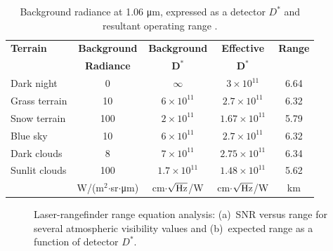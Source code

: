 \begin{table}[tb]
\centering
\caption{Background radiance at 1.06 \si{\micro\metre}{}, expressed as a detector $D^\ast$ and resultant operating range \cite{Kaminski1980}.\label{tab:rangefinderperformance}}
\begin{tabular}{|l|c|c|c|c|}
\hline
\textbf{Terrain} & \textbf{Background} & \textbf{Background} & \textbf{Effective} & \textbf{Range} \\
         & \textbf{Radiance} &$\bm{D^\ast}$&$\bm{D^\ast}$ & \\
\hline
Dark night   & 0    & $\infty$               & $3\times10^{11}$ &6.64 \\
Grass terrain & 10 & $6\times10^{11}$ &$2.7\times10^{11}$ & 6.32\\
Snow terrain & 100 &$2\times10^{11}$ &$1.67\times10^{11}$ &5.79 \\
\hline
Blue sky & 10 &$6\times10^{11}$ &$2.7\times10^{11}$ & 6.32\\
Dark clouds & 8 &$7\times10^{11}$ &$2.75\times10^{11}$  &6.34 \\
Sunlit clouds & 100 & $1.7\times10^{11}$ &$1.48\times10^{11}$ &5.62 \\
\hline
& W/(m$^2$$\cdot$sr$\cdot$\si{\micro\metre}{}) & cm$\cdot$$\sqrt{\rm Hz}$/W & cm$\cdot$$\sqrt{\rm Hz}$/W  & km\colheightrule\\
\hline
\end{tabular}
\end{table}

\begin{figure}[tb]
\centering
{}
\caption
{\label{kamif}Laser-rangefinder range equation analysis: (a)~SNR versus range for several atmospheric visibility values and (b)~expected range as a function of detector $D^\ast$.}
\end{figure}

